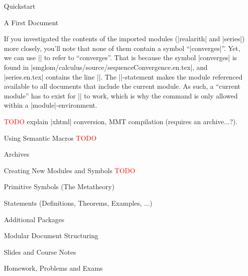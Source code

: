 \begin{omgroup}{Quickstart}
\begin{omgroup}{A First \sTeX Document}
    \begin{function}{\importmodule}
      If you investigated the contents of the imported modules 
      (|realarith| and |series|) more closely, you'll note that
      none of them contain a symbol ``|converges|''. Yet, we
      can use |\symref| to refer to ``converges''. That is because
      the symbol |converges| is found in 
      |smglom/calculus/source/sequenceConvergence.en.tex|, and
      |series.en.tex| contains the line
      ||. The |\importmodule|-statement
      makes the module referenced available to all documents
      that include the current module. As such, a ``current module''
      has to exist for |\importmodule| to work, which is why the command
      is only allowed within a |module|-environment.
    \end{function}

    \textcolor{red}{TODO} explain |xhtml| conversion, MMT compilation
    (requires an archive...?).

	\end{omgroup}
\end{omgroup}

\begin{omgroup}{Using Semantic Macros}
	\textcolor{red}{TODO}
  
  
\end{omgroup}

\begin{omgroup}[id=sec.stexarchives]{\sTeX Archives}
  
\end{omgroup}

\begin{omgroup}{Creating New Modules and Symbols}
	\textcolor{red}{TODO}
  
  
  
  
  \begin{omgroup}{Primitive Symbols (The \sTeX Metatheory)}
    
  \end{omgroup}
\end{omgroup}

\begin{omgroup}{\sTeX Statements (Definitions, Theorems, Examples, ...)}
  
  
\end{omgroup}

\begin{omgroup}{Additional Packages}
  
  \begin{omgroup}{Modular Document Structuring}
    
  \end{omgroup}
  \begin{omgroup}{Slides and Course Notes}
    
  \end{omgroup}
  \begin{omgroup}{Homework, Problems and Exams}
    
    
  \end{omgroup}

\end{omgroup}

